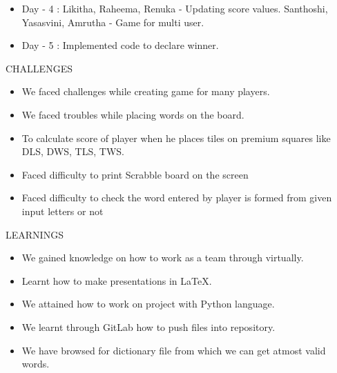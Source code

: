 \documentclass[13.5pt]{beamer}
\begin{document}
\begin{frame}
\begin{itemize}
    \item Day - 4 : \hspace{10cm}
    Likitha, Raheema, Renuka \hspace{0.7cm} - Updating score values.
    Santhoshi, Yasasvini, Amrutha \hspace{0.001cm} - Game for multi user.
    \item Day - 5 : Implemented code to declare winner.
\end{itemize}
    
\end{frame}


\begin{frame}{CHALLENGES}
    \begin{itemize}
    
        \item We faced challenges while creating game for many players.
        
        \item We faced troubles while placing words on the board.
        
        \item To calculate score of player  when he places tiles on premium squares like DLS, DWS, TLS, TWS.
        
        \item Faced difficulty to print Scrabble board on the screen

        \item Faced difficulty to check the word entered by player is formed from given input letters or not
        
    \end{itemize}
\end{frame}


\begin{frame}{LEARNINGS}

\begin{itemize}

\item We gained knowledge on how to work as a team through virtually.

\item Learnt how to make presentations in LaTeX.

\item We attained how to work on project with Python language.

\item We learnt through GitLab how to push files into repository.

\item We have browsed for dictionary file from which we can get atmost valid words.

\end{itemize}
   
\end{frame}
\end{document}
